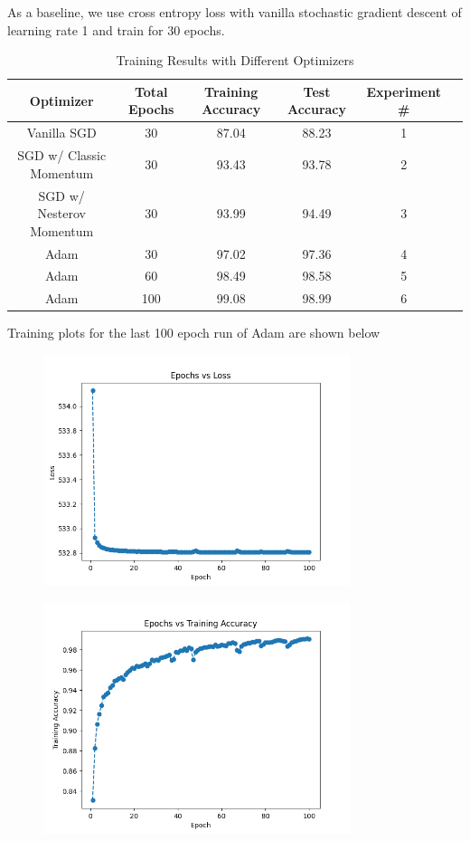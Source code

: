 \documentclass[11pt]{article}
\theoremstyle{definition}
\begin{document}
As a baseline, we use cross entropy loss with vanilla stochastic gradient descent of learning rate 1 and train for 30 epochs.




\begin{table}[H]
\centering
\begin{tabular}{| c | c | c | c | c | c |}
\hline
Optimizer & Total Epochs & Training Accuracy & Test Accuracy & Experiment \#\\
\hline
Vanilla SGD & 30 & 87.04 & 88.23  & 1\\
\hline
SGD w/ Classic Momentum & 30 & 93.43 & 93.78 & 2 \\
\hline
SGD w/ Nesterov Momentum & 30 & 93.99 & 94.49 & 3 \\
\hline
Adam & 30 &  97.02 & 97.36 & 4 \\
\hline
Adam & 60 & 98.49 & 98.58 & 5\\
\hline
Adam & 100 & 99.08 & 98.99 & 6\\
\hline
\end{tabular}
\caption{Training Results with Different Optimizers}
\end{table}

Training plots for the last 100 epoch run of Adam are shown below
\begin{figure}[H]
\begin{center}
  \includegraphics[width=9cm,keepaspectratio]{images/loss.png}
\end{center}
\end{figure}

\begin{figure}[H]
\begin{center}
  \includegraphics[width=9cm,keepaspectratio]{images/train_acc.png}
\end{center}
\end{figure}
\end{document}
